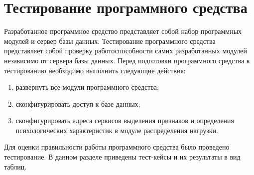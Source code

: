 \newcommand{\tableHead}{\hline Название тест-кейса & Шаги & Ожидаемый результат & Результат \\ \hline}

\section{Тестирование программного средства}
\label{sec:testing}

Разработанное программное средство представляет собой набор программных модулей и сервер базы данных. Тестирование программного средства представляет собой проверку работоспособности самих разработанных модулей независимо от сервера базы данных. 
Перед подготовки программного средства к тестированию необходимо выполнить следующие действия:
\begin{enumerate}
  \item развернуть все модули программного средства;
  \item сконфигурировать доступ к базе данных;
  \item сконфигурировать адреса сервисов выделения признаков и определения психологических характеристик в модуле распределения нагрузки.
\end{enumerate}

Для оценки правильности работы программного средства было проведено тестирование. В данном разделе приведены тест-кейсы и их результаты в вид таблиц.

